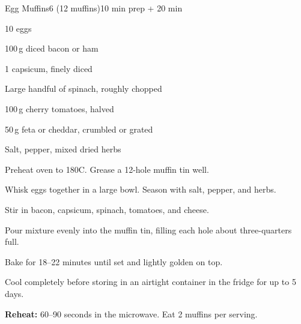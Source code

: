\begin{recipebox}{Egg Muffins}{6 (12 muffins)}{10 min prep + 20 min}
\begin{ingredients}
  \item 10 eggs
  \item 100\,g diced bacon or ham
  \item 1 capsicum, finely diced
  \item Large handful of spinach, roughly chopped
  \item 100\,g cherry tomatoes, halved
  \item 50\,g feta or cheddar, crumbled or grated
  \item Salt, pepper, mixed dried herbs
\end{ingredients}

\begin{method}
  \item Preheat oven to 180\textdegree C. Grease a 12-hole muffin tin well.
  \item Whisk eggs together in a large bowl. Season with salt, pepper, and herbs.
  \item Stir in bacon, capsicum, spinach, tomatoes, and cheese.
  \item Pour mixture evenly into the muffin tin, filling each hole about three-quarters full.
  \item Bake for 18--22 minutes until set and lightly golden on top.
  \item Cool completely before storing in an airtight container in the fridge for up to 5 days.
\end{method}

\begin{notelist}
  \item \textbf{Reheat:} 60--90 seconds in the microwave. Eat 2 muffins per serving.
\end{notelist}
\end{recipebox}
